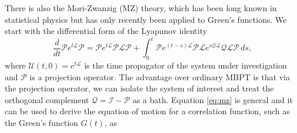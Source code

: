 \documentclass[12pt]{article}
\begin{document}
There is also the Mori-Zwanzig (MZ) theory, which has been long known in statistical physics but has only recently been applied to Green's functions. We start with the differential form of the Lyapunov identity
\begin{equation}
\frac{d}{d t} \mathcal{P} e^{t \mathcal{L}} \mathcal{P} = \mathcal{P} e^{t \mathcal{L}} \mathcal{P} \mathcal{L} \mathcal{P} + \int_0^t \mathcal{P} e^{(t-s) \mathcal{L}} \mathcal{P} \mathcal{L} e^{s \mathcal{Q} \mathcal{L}} \mathcal{Q} \mathcal{L} \mathcal{P} \, ds , 
\label{eq:mz}
\end{equation}
where \( \mathcal{U}(t, 0) = e^{t \mathcal{L}} \) is the time propagator of the system under investigation and \( \mathcal{P} \) is a projection operator. The advantage over ordinary MBPT is that via the projection operator, we can isolate the system of interest and treat the orthogonal complement \( \mathcal{Q} = \mathcal{I} - \mathcal{P} \) as a bath. Equation \ref{eq:mz} is general and it can be used to derive the equation of motion for a correlation function, such as the Green's function \( G(t) \), as
\end{document}
